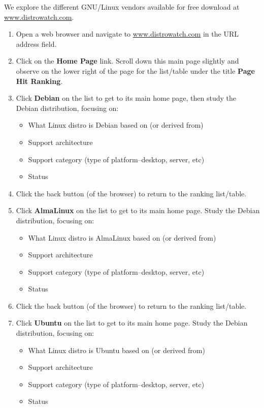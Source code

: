We explore the different GNU/Linux vendors available for free download at {\url{www.distrowatch.com}}. 

\begin{enumerate}
\item Open a web browser and navigate to {\url{www.distrowatch.com}} in the URL address field. 
\item Click on the {\bf{Home Page}} link. Scroll down this main page slightly and observe on the lower right of the page for the list/table under the title {\bf{Page Hit Ranking}}. 
\item Click {\bf{Debian}} on the list to get to its main home page, then study the Debian distribution, focusing on: 

\begin{itemize} 
    \item What Linux distro is Debian based on (or derived from) 
    \item Support architecture
    \item Support category (type of platform--desktop, server, etc)
    \item Status 
\end{itemize} 

\item Click the back button (of the browser) to return to the ranking list/table.

\item Click {\bf{AlmaLinux}} on the list to get to its main home page. Study the Debian distribution, focusing on:

\begin{itemize} 
    \item What Linux distro is AlmaLinux based on (or derived from)
    \item Support architecture
    \item Support category (type of platform--desktop, server, etc)
    \item Status 
\end{itemize} 

\item Click the back button (of the browser) to return to the ranking list/table.

\item Click {\bf{Ubuntu}} on the list to get to its main home page. Study the Debian distribution, focusing on:

\begin{itemize} 
    \item What Linux distro is Ubuntu based on (or derived from)
    \item Support architecture
    \item Support category (type of platform--desktop, server, etc)
    \item Status 
\end{itemize} 

\end{enumerate}

